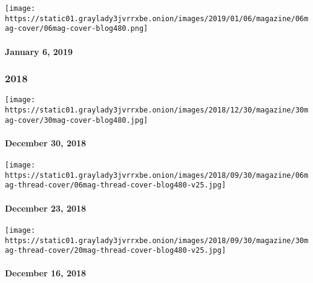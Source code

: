 \href{https://www.nytimes3xbfgragh.onion/issue/magazine/2019/01/04/the-1619-issue}{}

\texttt{[image: https://static01.graylady3jvrrxbe.onion/images/2019/01/06/magazine/06mag-cover/06mag-cover-blog480.png]}

\hypertarget{january-6-2019}{%
\paragraph{January 6, 2019}\label{january-6-2019}}

\hypertarget{2018}{%
\subsubsection{2018}\label{2018}}

\href{https://www.nytimes3xbfgragh.onion/interactive/2018/12/27/magazine/lives-they-lived-obituaries.html}{}

\texttt{[image: https://static01.graylady3jvrrxbe.onion/images/2018/12/30/magazine/30mag-cover/30mag-cover-blog480.jpg]}

\hypertarget{december-30-2018}{%
\paragraph{December 30, 2018}\label{december-30-2018}}

\href{https://www.nytimes3xbfgragh.onion/issue/magazine/2019/01/03/122318-issue}{}

\texttt{[image: https://static01.graylady3jvrrxbe.onion/images/2018/09/30/magazine/06mag-thread-cover/06mag-thread-cover-blog480-v25.jpg]}

\hypertarget{december-23-2018}{%
\paragraph{December 23, 2018}\label{december-23-2018}}

\href{https://www.nytimes3xbfgragh.onion/issue/magazine/2019/01/03/121618-issue}{}

\texttt{[image: https://static01.graylady3jvrrxbe.onion/images/2018/09/30/magazine/30mag-thread-cover/20mag-thread-cover-blog480-v25.jpg]}

\hypertarget{december-16-2018}{%
\paragraph{December 16, 2018}\label{december-16-2018}}


